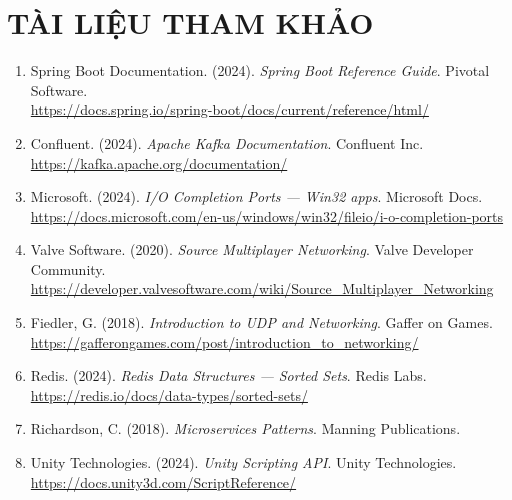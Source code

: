 \documentclass[12pt,a4paper]{report}
\newcommand{\chapprefix}{CHƯƠNG}
\renewcommand{\cftchappresnum}{CHƯƠNG }
\begin{document}
\chapter*{TÀI LIỆU THAM KHẢO}
\thispagestyle{fancy}

\begin{enumerate}
  \item Spring Boot Documentation. (2024). \textit{Spring Boot Reference Guide}. Pivotal Software.\\
        \url{https://docs.spring.io/spring-boot/docs/current/reference/html/}

  \item Confluent. (2024). \textit{Apache Kafka Documentation}. Confluent Inc.\\
        \url{https://kafka.apache.org/documentation/}

  \item Microsoft. (2024). \textit{I/O Completion Ports --- Win32 apps}. Microsoft Docs.\\
        \url{https://docs.microsoft.com/en-us/windows/win32/fileio/i-o-completion-ports}

  \item Valve Software. (2020). \textit{Source Multiplayer Networking}. Valve Developer Community.\\
        \url{https://developer.valvesoftware.com/wiki/Source_Multiplayer_Networking}

  \item Fiedler, G. (2018). \textit{Introduction to UDP and Networking}. Gaffer on Games.\\
        \url{https://gafferongames.com/post/introduction_to_networking/}

  \item Redis. (2024). \textit{Redis Data Structures --- Sorted Sets}. Redis Labs.\\
        \url{https://redis.io/docs/data-types/sorted-sets/}

  \item Richardson, C. (2018). \textit{Microservices Patterns}. Manning Publications.

  \item Unity Technologies. (2024). \textit{Unity Scripting API}. Unity Technologies.\\
        \url{https://docs.unity3d.com/ScriptReference/}
\end{enumerate}

\appendix
\renewcommand{\chapprefix}{PHỤ LỤC}
\addtocontents{toc}{%
  \protect\renewcommand{\cftchappresnum}{PHỤ LỤC }%
}
\end{document}
